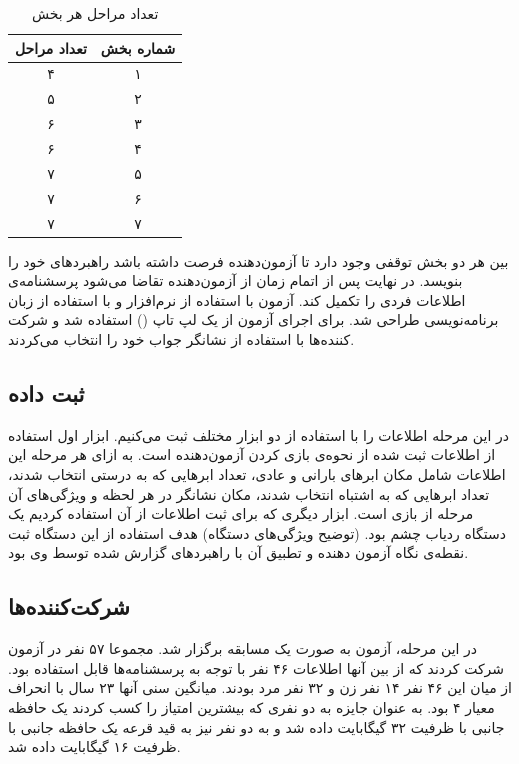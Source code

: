 \documentclass[twoside, a4paper,11pt]{book}
\numberwithin{equation}{chapter}
\numberwithin{table}{chapter}
\numberwithin{figure}{chapter}
\numberwithin{equation}{chapter}
\begin{document}
\begin{table}[]
\centering
\caption{تعداد مراحل هر بخش}
\label{numOfLevelTable}
\begin{tabular}{|c|c|}
\hline
\textbf{تعداد مراحل} & \textbf{شماره بخش} \\ \hline
۴                    & ۱                  \\ \hline
۵                    & ۲                  \\ \hline
۶                    & ۳                  \\ \hline
۶                    & ۴                  \\ \hline
۷                    & ۵                  \\ \hline
۷                    & ۶                  \\ \hline
۷                    & ۷                  \\ \hline
\end{tabular}
\end{table}


بین هر دو بخش توقفی وجود دارد تا آزمون‌دهنده فرصت داشته باشد راهبرد‌های خود را بنویسد. در نهایت پس از اتمام زمان از آزمون‌دهنده تقاضا می‌شود پرسشنامه‌ی اطلاعات فردی را تکمیل کند.
آزمون با استفاده از نرم‌افزار  و با استفاده از زبان برنامه‌نویسی   طراحی شد. برای اجرای آزمون از یک لپ تاپ () استفاده شد و شرکت کننده‌ها با استفاده از نشانگر جواب خود را انتخاب می‌کردند.

\subsection{ثبت داده}
در این مرحله اطلاعات را با استفاده از دو ابزار مختلف ثبت می‌کنیم. ابزار اول استفاده از اطلاعات ثبت شده از نحوه‌ی بازی کردن آزمون‌دهنده است. به ازای هر مرحله این اطلاعات شامل مکان ابرهای بارانی و عادی، تعداد ابرهایی که به درستی انتخاب شدند، تعداد ابرهایی که به اشتباه انتخاب شدند، مکان نشانگر در هر لحظه و ویژگی‌های آن مرحله از بازی است.
ابزار دیگری که برای ثبت اطلاعات از آن استفاده کردیم یک دستگاه ردیاب چشم بود. (توضیح ویژگی‌های دستگاه) هدف استفاده از این دستگاه ثبت نقطه‌ی نگاه آزمون دهنده و تطبیق آن با راهبرد‌های گزارش شده توسط وی بود.

\subsection{شرکت‌کننده‌ها}
در این مرحله، آزمون به صورت یک مسابقه برگزار شد. مجموعا ۵۷ نفر در آزمون شرکت کردند که از بین آنها اطلاعات ۴۶ نفر با توجه به پرسشنامه‌ها قابل استفاده بود. از میان این ۴۶ نفر ۱۴ نفر زن و ۳۲ نفر مرد بودند. میانگین سنی آنها ۲۳ سال با انحراف معیار ۴ بود. به عنوان جایزه به دو نفری که بیشترین امتیاز را کسب کردند یک حافظه جانبی با ظرفیت ۳۲ گیگابایت داده شد و به دو نفر نیز به قید قرعه یک حافظه جانبی با ظرفیت ۱۶ گیگابایت داده شد.
\end{document}
